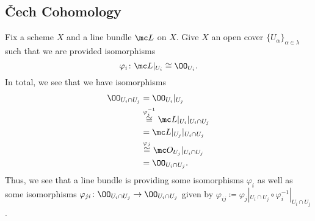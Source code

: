 \documentclass[../notes.tex]{subfiles}
\begin{document}
\subsection{\v Cech Cohomology}
Fix a scheme $X$ and a line bundle $\mc L$ on $X$. Give $X$ an open cover $\{U_\alpha\}_{\alpha\in\lambda}$ such that we are provided isomorphisms
\[\varphi_i\colon\mc L|_{U_i}\cong\OO_{U_i}.\]
In total, we see that we have isomorphisms
\begin{align*}
	\OO_{U_i\cap U_j} &= \OO_{U_i}|_{U_j} \\
	&\stackrel{\varphi_i^{-1}}\cong \mc L|_{U_i}|_{U_i\cap U_j} \\
	&= \mc L|_{U_j}|_{U_i\cap U_j} \\
	&\stackrel{\varphi_j}\cong \mc O_{U_j}|_{U_i\cap U_j} \\
	&= \OO_{U_i\cap U_j}.
\end{align*}
Thus, we see that a line bundle is providing some isomorphisms $\varphi_i$ as well as some isomorphisms $\varphi_{ji}\colon\OO_{U_i\cap U_j}\to\OO_{U_i\cap U_j}$ given by $\varphi_{ij}\coloneqq\varphi_j|_{U_i\cap U_j}\circ\varphi_i^{-1}|_{U_i\cap U_j}$.
\end{document}
